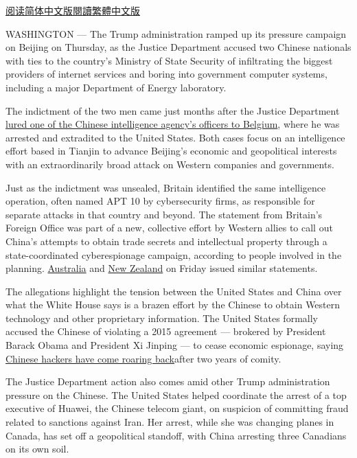 \href{https://cn.nytimes.com/usa/20181221/us-and-other-nations-to-announce-china-crackdown/}{阅读简体中文版}\href{https://cn.nytimes.com/usa/20181221/us-and-other-nations-to-announce-china-crackdown/zh-hant/}{閱讀繁體中文版}

WASHINGTON --- The Trump administration ramped up its pressure campaign
on Beijing on Thursday, as the Justice Department accused two Chinese
nationals with ties to the country's Ministry of State Security of
infiltrating the biggest providers of internet services and boring into
government computer systems, including a major Department of Energy
laboratory.

The indictment of the two men came just months after the Justice
Department
\href{https://www.nytimes.com/2018/10/10/us/politics/china-spy-espionage-arrest.html}{lured
one of the Chinese intelligence agency's officers to Belgium}, where he
was arrested and extradited to the United States. Both cases focus on an
intelligence effort based in Tianjin to advance Beijing's economic and
geopolitical interests with an extraordinarily broad attack on Western
companies and governments.

Just as the indictment was unsealed, Britain identified the same
intelligence operation, often named APT 10 by cybersecurity firms, as
responsible for separate attacks in that country and beyond. The
statement from Britain's Foreign Office was part of a new, collective
effort by Western allies to call out China's attempts to obtain trade
secrets and intellectual property through a state-coordinated
cyberespionage campaign, according to people involved in the planning.
\href{https://foreignminister.gov.au/releases/Pages/2018/mp_mr_181221.aspx}{Australia}
and
\href{https://www.gcsb.govt.nz/news/cyber-campaign-attributed-to-china/}{New
Zealand} on Friday issued similar statements.

The allegations highlight the tension between the United States and
China over what the White House says is a brazen effort by the Chinese
to obtain Western technology and other proprietary information. The
United States formally accused the Chinese of violating a 2015 agreement
--- brokered by President Barack Obama and President Xi Jinping --- to
cease economic espionage, saying
\href{https://www.nytimes.com/2018/11/29/us/politics/china-trump-cyberespionage.html}{Chinese
hackers have come roaring back}after two years of comity.

The Justice Department action also comes amid other Trump administration
pressure on the Chinese. The United States helped coordinate the arrest
of a top executive of Huawei, the Chinese telecom giant, on suspicion of
committing fraud related to sanctions against Iran. Her arrest, while
she was changing planes in Canada, has set off a geopolitical standoff,
with China arresting three Canadians on its own soil.

